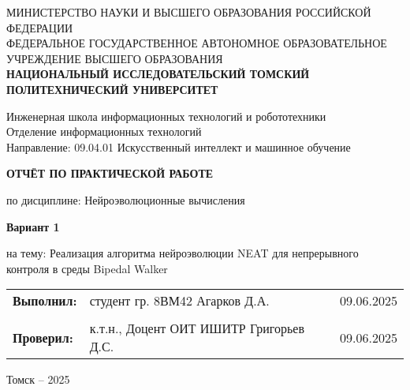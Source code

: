 \documentclass[a4paper,12pt]{article}
\begin{document}
\begin{titlepage}
	\vspace*{1cm}
	{\small
		\begin{center}
			МИНИСТЕРСТВО НАУКИ И ВЫСШЕГО ОБРАЗОВАНИЯ РОССИЙСКОЙ ФЕДЕРАЦИИ\\
			ФЕДЕРАЛЬНОЕ ГОСУДАРСТВЕННОЕ АВТОНОМНОЕ ОБРАЗОВАТЕЛЬНОЕ УЧРЕЖДЕНИЕ ВЫСШЕГО ОБРАЗОВАНИЯ\\
			\textbf{НАЦИОНАЛЬНЫЙ ИССЛЕДОВАТЕЛЬСКИЙ ТОМСКИЙ ПОЛИТЕХНИЧЕСКИЙ УНИВЕРСИТЕТ}
		\end{center}
	}
	\vspace{0.5cm}
	\begin{center}
		Инженерная школа информационных технологий и робототехники\\
		Отделение информационных технологий\\
		Направление: 09.04.01 Искусственный интеллект и машинное обучение
	\end{center}
	\vspace{1cm}
	\begin{center}
		\textbf{ОТЧЁТ ПО ПРАКТИЧЕСКОЙ РАБОТЕ}
	\end{center}
	\begin{center}
		по дисциплине: Нейроэволюционные вычисления
	\end{center}
	\vspace{0.5cm}
	\begin{center}
		\textbf{Вариант 1}
	\end{center}
	\begin{center}
		на тему: Реализация алгоритма нейроэволюции NEAT для непрерывного контроля в среды Bipedal Walker
	\end{center}
	\vspace{1cm}
	
	\begin{tabular}{p{} p{} p{}}
		\textbf{Выполнил:} & студент гр. 8ВМ42 \newline Агарков Д.А.& 09.06.2025\\
		& & \\
		\textbf{Проверил:} & к.т.н., Доцент ОИТ ИШИТР \newline Григорьев Д.С. & 09.06.2025\end{tabular}
	\vfill
	\begin{center}
		Томск – 2025
	\end{center}
\end{titlepage}
\end{document}
